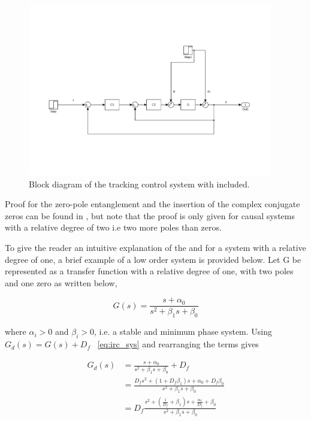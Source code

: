 \begin{figure}[h]
  \centering %
  \includegraphics[width=0.95\textwidth, trim=4cm 5cm 3.6cm 9.5cm, clip=true]{fig/matlab/irc_int}
  \caption{\label{fig:irc_int}Block diagram of the tracking control system with \abbrIRC included.}
\end{figure}

Proof for the zero-pole entanglement and the insertion of the complex conjugate zeros can be found in \citep{Aphale:2007}, but note that the proof is only given for causal systems with a relative degree of two i.e two more poles than zeros.

To give the reader an intuitive explanation of the \abbrIRC and for a system with a relative degree of one, a brief example of a low order system is provided below. Let G be represented as a transfer function with a relative degree of one, with two poles and one zero as written below,

\begin{equation}
  \label{eq:irc_sys}
  G(s) = \frac{s + \alpha_0}{s^2 + \beta_1s + \beta_0}
\end{equation}

where  $\alpha_i > 0$ and  $\beta_i > 0$, i.e. a stable and minimum phase system.  Using $G_d(s) = G(s) + D_f$  ~\eqref{eq:irc_sys} and rearranging the terms gives

\begin{equation}
  \label{eq:irc_sys_d}
  \begin{split}
  G_d(s) & = \frac{s + \alpha_0}{s^2 + \beta_1s + \beta_0} + D_f \\
      & = \frac{D_fs^2 + (1 + D_f\beta_1)s + \alpha_0 + D_f\beta_0}{s^2 + \beta_1s + \beta_0} \\
      & = D_f\frac{s^2 + (\frac{1}{D_f} + \beta_1)s + \frac{\alpha_0}{D_f} + \beta_0}{s^2 + \beta_1s + \beta_0}
  \end{split}
\end{equation}


